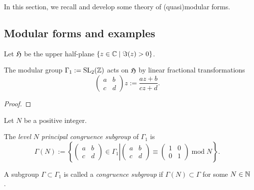 
In this section, we recall and develop some theory of (quasi)modular forms.

\subsection{Modular forms and examples}

Let $\mathfrak{H}$ be the upper half-plane $\{z\in\mathbb{C}\mid\Im(z)>0\}$.
\begin{lemma}\label{def:Gamma-1-Action}\leanok
    The modular group $\Gamma_1:=\mathrm{SL}_2(\mathbb{Z})$ acts on $\mathfrak{H}$ by linear fractional transformations
$$\left(\begin{smallmatrix}a&b\\c&d\end{smallmatrix}\right)z:=\frac{az+b}{cz+d}.$$
\end{lemma}
\begin{proof}
    \leanok
\end{proof}

Let $N$ be a positive integer.
\begin{definition}\label{def:level-N-princ-cong-subgp}\leanok
    The \emph{level $N$ principal congruence subgroup} of $\Gamma_1$ is
    $$\Gamma(N):=\left\{\left.\left(\begin{smallmatrix}a&b\\c&d\end{smallmatrix}\right)\in\Gamma_1\right|\left(\begin{smallmatrix}a&b\\c&d\end{smallmatrix}\right)\equiv\left(\begin{smallmatrix}1&0\\0&1\end{smallmatrix}\right)\;\mathrm{mod}\;N\right\}.$$
\end{definition}

\begin{definition}\label{def:congruence-subgroup}\leanok
    A subgroup $\Gamma\subset\Gamma_1$ is called a \emph{congruence subgroup} if $\Gamma(N)\subset\Gamma$ for some $N\in\mathbb{N}$.
\end{definition}

